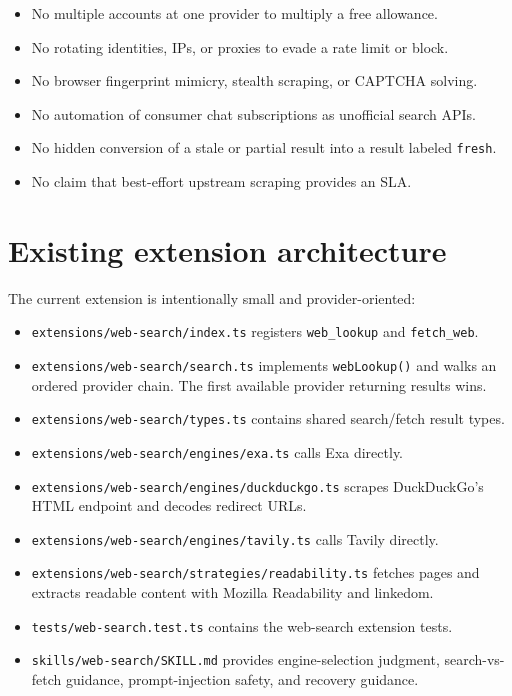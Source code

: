 \documentclass[11pt]{article}
\begin{document}
\begin{itemize}
\item No multiple accounts at one provider to multiply a free allowance.
\item No rotating identities, IPs, or proxies to evade a rate limit or block.
\item No browser fingerprint mimicry, stealth scraping, or CAPTCHA solving.
\item No automation of consumer chat subscriptions as unofficial search APIs.
\item No hidden conversion of a stale or partial result into a result labeled
\texttt{fresh}.
\item No claim that best-effort upstream scraping provides an SLA.
\end{itemize}
\section*{Existing extension architecture}
\label{sec:org2b4b739}

The current extension is intentionally small and provider-oriented:

\begin{itemize}
\item \texttt{extensions/web-search/index.ts} registers \texttt{web\_lookup} and \texttt{fetch\_web}.
\item \texttt{extensions/web-search/search.ts} implements \texttt{webLookup()} and walks an
ordered provider chain.  The first available provider returning results wins.
\item \texttt{extensions/web-search/types.ts} contains shared search/fetch result types.
\item \texttt{extensions/web-search/engines/exa.ts} calls Exa directly.
\item \texttt{extensions/web-search/engines/duckduckgo.ts} scrapes DuckDuckGo's HTML
endpoint and decodes redirect URLs.
\item \texttt{extensions/web-search/engines/tavily.ts} calls Tavily directly.
\item \texttt{extensions/web-search/strategies/readability.ts} fetches pages and extracts
readable content with Mozilla Readability and linkedom.
\item \texttt{tests/web-search.test.ts} contains the web-search extension tests.
\item \texttt{skills/web-search/SKILL.md} provides engine-selection judgment,
search-vs-fetch guidance, prompt-injection safety, and recovery guidance.
\end{itemize}
\end{document}
